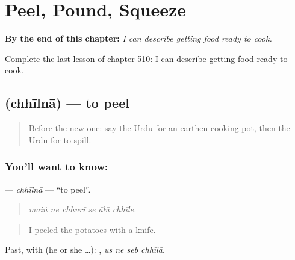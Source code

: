
\chapter{Peel, Pound, Squeeze}
\label{ch:ur-peel-pound-squeeze}

\begin{chapteropening}
\textbf{By the end of this chapter:} \emph{I can describe getting food ready to cook.}

Complete the last lesson of chapter 510: I can describe getting food ready to cook.
\end{chapteropening}

\section[\texorpdfstring{\ur{چھیلنا} (chhīlnā)}{چھیلنا (chhīlnā)}]{ (chhīlnā) — to peel}

\label{lesson:UR-C510-chhilna-peel}



\begin{quote}
Before the new one: say the Urdu for an earthen cooking pot, then the Urdu for to spill.
\end{quote}

\subsection*{You'll want to know: }
\textbf{} — \emph{chhīlnā} — \textquotedblleft{}to peel\textquotedblright{}.

\begin{quote}
     
\end{quote}

\begin{quote}
\emph{maiṅ ne chhurī se ālū chhīle.}
\end{quote}

\begin{quote}
I peeled the potatoes with a knife.
\end{quote}

Past, with  (he or she …):    , \emph{us ne seb chhīlā}.

